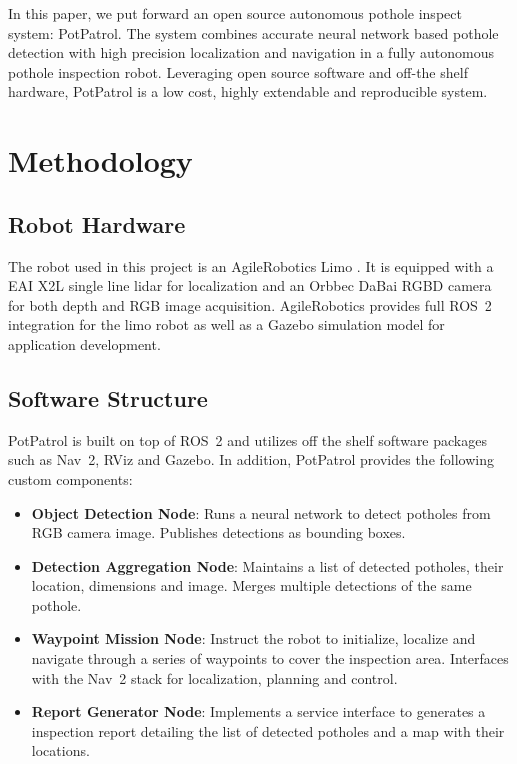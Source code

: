 \documentclass[conference]{IEEEtran}
\begin{document}
In this paper, we put forward an open source autonomous pothole inspect system: PotPatrol. The system combines accurate neural network based pothole detection with high precision localization and navigation in a fully autonomous pothole inspection robot. Leveraging open source software and off-the shelf hardware, PotPatrol is a low cost, highly extendable and reproducible system.

\section{Methodology}

\subsection{Robot Hardware}

The robot used in this project is an AgileRobotics Limo \cite{AgilexAi}. It is equipped with a EAI X2L single line lidar \cite{YDLIDARX2_YDLIDARFocus} for localization and an Orbbec DaBai \cite{HomeORBBEC3D} RGBD camera for both depth and RGB image acquisition. AgileRobotics provides full ROS~2 integration for the limo robot as well as a Gazebo simulation model for application development.

\subsection{Software Structure}

PotPatrol is built on top of ROS~2 and utilizes off the shelf software packages such as Nav~2, RViz and Gazebo. In addition, PotPatrol provides the following custom components:

\begin{itemize}
    \item \textbf{Object Detection Node}: Runs a neural network to detect potholes from RGB camera image. Publishes detections as bounding boxes.
    \item \textbf{Detection Aggregation Node}: Maintains a list of detected potholes, their location, dimensions and image. Merges multiple detections of the same pothole.
    \item \textbf{Waypoint Mission Node}: Instruct the robot to initialize, localize and navigate through a series of waypoints to cover the inspection area. Interfaces with the Nav~2 stack for localization, planning and control.
    \item \textbf{Report Generator Node}: Implements a service interface to generates a inspection report detailing the list of detected potholes and a map with their locations.
\end{itemize}
\end{document}
